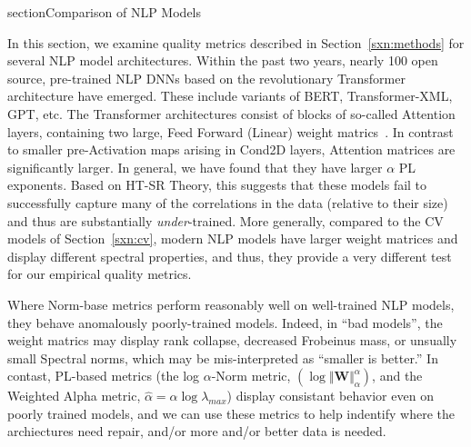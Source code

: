 section{Comparison of NLP Models}
\label{sxn:nlp}

In this section, we examine quality metrics described in Section~\ref{sxn:methods} for several NLP model architectures.
%
Within the past two years, nearly 100 open source, pre-trained NLP DNNs based on the revolutionary Transformer architecture have emerged.
These include variants of BERT, Transformer-XML, GPT, etc.
%
The Transformer architectures consist of blocks of so-called Attention layers, containing two large, Feed Forward (Linear) weight matrics~\cite{Attn2017}. 
In contrast to smaller pre-Activation maps arising in Cond2D layers, Attention matrices are significantly larger.
In general, we have found that they have larger $\alpha$ PL exponents.
Based on HT-SR Theory, 
this suggests that these models fail to successfully capture many of the correlations in the data (relative to their size) and thus are substantially \emph{under}-trained.
%
More generally, compared to the CV models of Section~\ref{sxn:cv},
modern NLP models have larger weight matrices and display different spectral properties, and 
thus, they provide a very different test for our empirical quality metrics.

Where Norm-base metrics perform reasonably well on well-trained NLP models, they behave anomalously poorly-trained models.
Indeed, in ``bad models'', the weight matrics may display rank collapse, decreased Frobeinus mass, or unsually small Spectral norms, 
which may be mis-interpreted as ``smaller is better.''
In contast, PL-based metrics (the log $\alpha$-Norm metric, 
$(\log\Vert\mathbf{W}\Vert_{\alpha}^{\alpha})$, and the Weighted Alpha metric, $\hat\alpha =\alpha\log\lambda_{max} $) display consistant behavior even on poorly trained models, and we can use these metrics to help indentify
where the archiectures need repair, and/or more and/or better data is needed.


